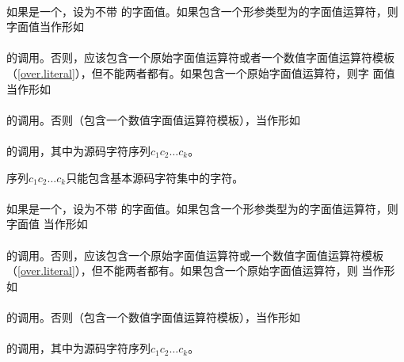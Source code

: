 \paragraph{} %
如果是一个，设为不带
的字面值。如果包含一个形参类型为的字面值运算符，则
字面值当作形如                                                          \\
\mbox{\qquad {}}                              \\
的调用。否则，应该包含一个原始字面值运算符或者一个数值字面值运算符模板
（\ref{over.literal}），但不能两者都有。如果包含一个原始字面值运算符，则字
面值当作形如                                                            \\
\mbox{\qquad {}}                               \\
的调用。否则（包含一个数值字面值运算符模板），当作形如            \\
\mbox{\qquad {}}                                                       \\
的调用，其中为源码字符序列$c_1c_2\ldots c_k$。

\begin{note} %
  序列$c_1c_2\ldots c_k$只能包含基本源码字符集中的字符。
\end{note}

\paragraph{} %
如果是一个，设为不带
的字面值。如果包含一个形参类型为的字面值运算符，则字面值
当作形如                                                                \\
\mbox{\qquad {}}                                \\
的调用。否则，应该包含一个原始字面值运算符或一个数值字面值运算符模板
（\ref{over.literal}），但不能两者都有。如果包含一个原始字面值运算符，则
 当作形如                                                    \\
\mbox{\qquad {}}                               \\
的调用。否则（包含一个数值字面值运算符模板），当作形如            \\
\mbox{\qquad {}}                                                       \\
的调用，其中为源码字符序列$c_1c_2 \ldots c_k$。

